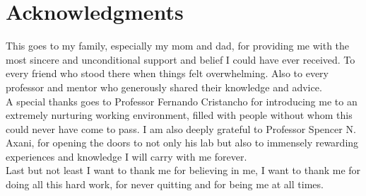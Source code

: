 \chapter*{Acknowledgments}
%

This goes to my family, especially my mom and dad, for providing me with the most sincere and unconditional support and belief I could have ever received. To every friend who stood there when things felt overwhelming. Also to every professor and mentor who generously shared their knowledge and advice.
\\

A special thanks goes to Professor Fernando Cristancho for introducing me to an extremely nurturing working environment, filled with people without whom this could never have come to pass. I am also deeply grateful to Professor Spencer N. Axani, for opening the doors to not only his lab but also to immensely rewarding experiences and knowledge I will carry with me forever.
\\

Last but not least I want to thank me for believing in me, I want to thank me for doing all this hard work, for never quitting and for being me at all times.